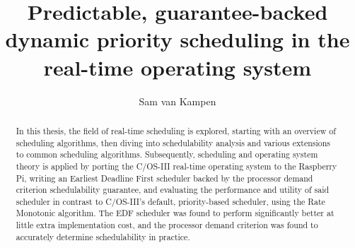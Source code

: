 \documentclass[twoside]{uva-inf-bachelor-thesis}
\title{Predictable, guarantee-backed\\dynamic priority scheduling in the \ucosiii real-time operating system}
\author{Sam van Kampen}
\newcommand{\ucosiii}{\textmu C/OS-III\xspace}
\begin{document}
\maketitle

\begin{abstract}
    In this thesis, the field of real-time scheduling is explored, starting with an overview of scheduling algorithms, then diving into schedulability analysis and various extensions to common scheduling algorithms. Subsequently, scheduling and operating system theory is applied by porting the \ucosiii real-time operating system to the Raspberry Pi, writing an Earliest Deadline First scheduler backed by the processor demand criterion schedulability guarantee, and evaluating the performance and utility of said scheduler in contrast to \ucosiii's default, priority-based scheduler, using the Rate Monotonic algorithm. The EDF scheduler was found to perform significantly better at little extra implementation cost, and the processor demand criterion was found to accurately determine schedulability in practice.
\end{abstract}


\tableofcontents

%
%
%
%



%
%
%
%



%
%
%
%



%
%
%
%



%
%
%
%



%
%
%
%



%
%



{
    \hfuzz=8pt
    \printbibliography
}
\end{document}
